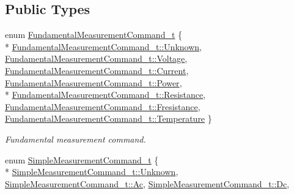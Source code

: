 \subsection*{Public Types}
\begin{DoxyCompactItemize}
\item 
enum \hyperlink{structmdt_scpi_function_farameter_a6c66a5f0deed788e511aa28e3683cf7e}{Fundamental\-Measurement\-Command\-\_\-t} \{ \\*
\hyperlink{structmdt_scpi_function_farameter_a6c66a5f0deed788e511aa28e3683cf7ea88183b946cc5f0e8c96b2e66e1c74a7e}{Fundamental\-Measurement\-Command\-\_\-t\-::\-Unknown}, 
\hyperlink{structmdt_scpi_function_farameter_a6c66a5f0deed788e511aa28e3683cf7ea4a92fbe41f6463598c39850b8335096c}{Fundamental\-Measurement\-Command\-\_\-t\-::\-Voltage}, 
\hyperlink{structmdt_scpi_function_farameter_a6c66a5f0deed788e511aa28e3683cf7ea222a267cc5778206b253be35ee3ddab5}{Fundamental\-Measurement\-Command\-\_\-t\-::\-Current}, 
\hyperlink{structmdt_scpi_function_farameter_a6c66a5f0deed788e511aa28e3683cf7eadd4fe0cc913f704600b97d1f5dd285de}{Fundamental\-Measurement\-Command\-\_\-t\-::\-Power}, 
\\*
\hyperlink{structmdt_scpi_function_farameter_a6c66a5f0deed788e511aa28e3683cf7ea9db444f7a3b8ba8f817647de53b7a6fe}{Fundamental\-Measurement\-Command\-\_\-t\-::\-Resistance}, 
\hyperlink{structmdt_scpi_function_farameter_a6c66a5f0deed788e511aa28e3683cf7ea09fa2c6ad3391741f7e0c728c00d04a7}{Fundamental\-Measurement\-Command\-\_\-t\-::\-Fresistance}, 
\hyperlink{structmdt_scpi_function_farameter_a6c66a5f0deed788e511aa28e3683cf7eaee7a8e262285ed49ea1b4e4ae11525bd}{Fundamental\-Measurement\-Command\-\_\-t\-::\-Temperature}
 \}
\begin{DoxyCompactList}\small\item\em Fundamental measurement command. \end{DoxyCompactList}\item 
enum \hyperlink{structmdt_scpi_function_farameter_a45845a283cab9adc77c0b9e9b00179bb}{Simple\-Measurement\-Command\-\_\-t} \{ \\*
\hyperlink{structmdt_scpi_function_farameter_a45845a283cab9adc77c0b9e9b00179bba88183b946cc5f0e8c96b2e66e1c74a7e}{Simple\-Measurement\-Command\-\_\-t\-::\-Unknown}, 
\hyperlink{structmdt_scpi_function_farameter_a45845a283cab9adc77c0b9e9b00179bba8819a837186918b90b59cc316f36b1e1}{Simple\-Measurement\-Command\-\_\-t\-::\-Ac}, 
\hyperlink{structmdt_scpi_function_farameter_a45845a283cab9adc77c0b9e9b00179bba32abe17880f303bea4930ed270e0181e}{Simple\-Measurement\-Command\-\_\-t\-::\-Dc}, 

\end{DoxyCompactItemize}

